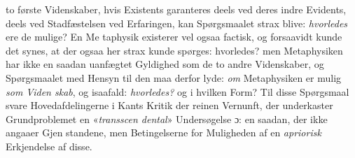 \documentclass[12pt,a4paper]{book}
\begin{document}
to første Videnskaber, hvis Existents garanteres deels ved deres
indre Evidents, deels ved Stadfæstelsen ved Erfaringen, kan
Spørgsmaalet strax blive: \emph{hvorledes} ere de mulige? En Me\-%
taphysik existerer vel ogsaa factisk, og forsaavidt kunde det
synes, at der ogsaa her strax kunde spørges: hvorledes? men
Metaphysiken har ikke en saadan uanfægtet Gyldighed som de
to andre Videnskaber, og Spørgsmaalet med Hensyn til den
maa derfor lyde: \emph{om} Metaphysiken er mulig \emph{som Viden\-%
skab}, og isaafald: \emph{hvorledes?} og i hvilken Form? Til disse
Spørgsmaal svare Hovedafdelingerne i Kants Kritik der reinen
Vernunft, der underkaster Grundproblemet en «\emph{transscen\-%
dental}» Undersøgelse ɔ: en saadan, der ikke angaaer Gjen\-%
standene, men Betingelserne for Muligheden af en \emph{apriorisk}
Erkjendelse af disse.
\end{document}
